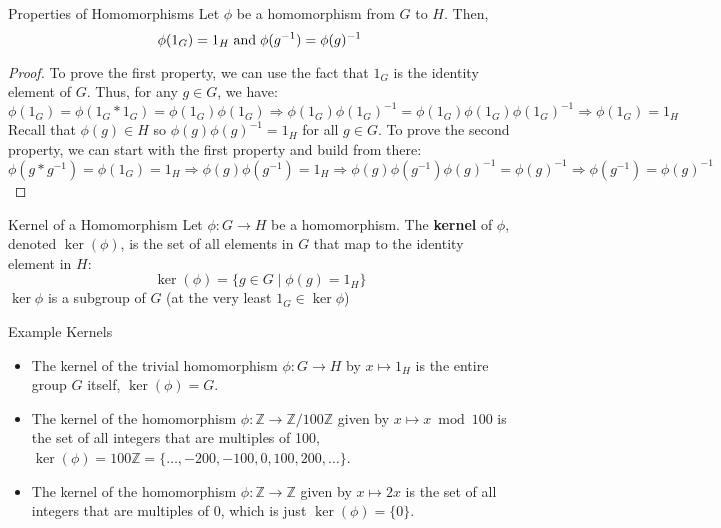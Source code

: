 \begin{fact}{Properties of Homomorphisms}{}
Let $\phi$ be a homomorphism from $G$ to $H$. Then,
    \begin{equation*}
        \phi(1_G) = 1_H \hspace{0.1cm} \text{and} \hspace{0.1cm} \phi(g^{-1}) = \phi(g)^{-1}
    \end{equation*}
\end{fact}
\begin{proof}
    To prove the first property, we can use the fact that $1_G$ is the identity element of $G$. Thus, for any $g \in G$, we have:
    \begin{equation*}
        \phi(1_G) = \phi(1_G * 1_G) = \phi(1_G)\phi(1_G) \Rightarrow \phi(1_G)\phi(1_G)^{-1} = \phi(1_G)\phi(1_G)\phi(1_G)^{-1} \Rightarrow \phi(1_G) = 1_H
    \end{equation*}
    Recall that $\phi(g) \in H$ so $\phi(g)\phi(g)^{-1} = 1_H$ for all $g \in G$. To prove the second property, we can start with the first property and build from there:
    \begin{equation*}
        \phi(g * g^{-1}) = \phi(1_G) = 1_H \Rightarrow \phi(g)\phi(g^{-1}) = 1_H \Rightarrow \phi(g)\phi(g^{-1})\phi(g)^{-1} = \phi(g)^{-1} \Rightarrow \phi(g^{-1}) = \phi(g)^{-1}
    \end{equation*}
\end{proof}

\begin{definition}{Kernel of a Homomorphism}{}
    Let $\phi: G \to H$ be a homomorphism. The \textbf{kernel} of $\phi$, denoted $\ker(\phi)$, is the set of all elements in $G$ that map to the identity element in $H$:
    \begin{equation*}
        \ker(\phi) = \{ g \in G \mid \phi(g) = 1_H \}
    \end{equation*}
    $\ker \phi$ is a subgroup of $G$ (at the very least $1_G \in \ker \phi$)
\end{definition}

\begin{example}{Example Kernels}{}
    \begin{itemize}
        \item The kernel of the trivial homomorphism $\phi: G \to H$ by $x \mapsto 1_H$ is the entire group $G$ itself, $\ker(\phi) = G$.
        \item The kernel of the homomorphism $\phi: \mathbb{Z} \to \mathbb{Z}/100\mathbb{Z}$ given by $x \mapsto x \bmod 100$ is the set of all integers that are multiples of 100, $\ker(\phi) = 100\mathbb{Z} = \{\dots, -200, -100, 0, 100, 200, \dots\}$.
        \item The kernel of the homomorphism $\phi: \mathbb{Z} \to \mathbb{Z}$ given by $x \mapsto 2x$ is the set of all integers that are multiples of 0, which is just $\ker(\phi) = \{0\}$.
    \end{itemize}

\end{example}

